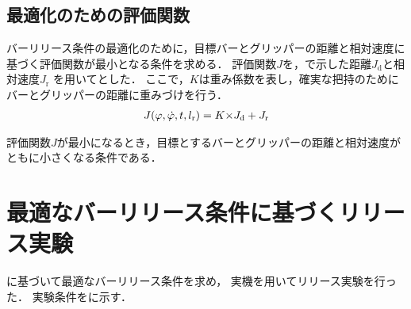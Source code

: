         \subsection{最適化のための評価関数}
        
        バーリリース条件の最適化のために，目標バーとグリッパーの距離と相対速度に基づく評価関数が最小となる条件を求める．
        評価関数$J$を，で示した距離$J_{\mathrm{d}}$と相対速度$J_{\mathrm{r}}$
        を用いてとした．
        ここで，$K$は重み係数を表し，確実な把持のためにバーとグリッパーの距離に重みづけを行う．
        \begin{eqnarray}
          \equlabel{J}
          J(\varphi,\dot{\varphi},t,l_{\mathrm{r}})=K{\times}J_{\mathrm{d}}+J_{\mathrm{r}}
        \end{eqnarray}
        
        評価関数$J$が最小になるとき，目標とするバーとグリッパーの距離と相対速度がともに小さくなる条件である．


      \section{最適なバーリリース条件に基づくリリース実験}
          
        に基づいて最適なバーリリース条件を求め，
        実機を用いてリリース実験を行った．
        実験条件をに示す．

        

